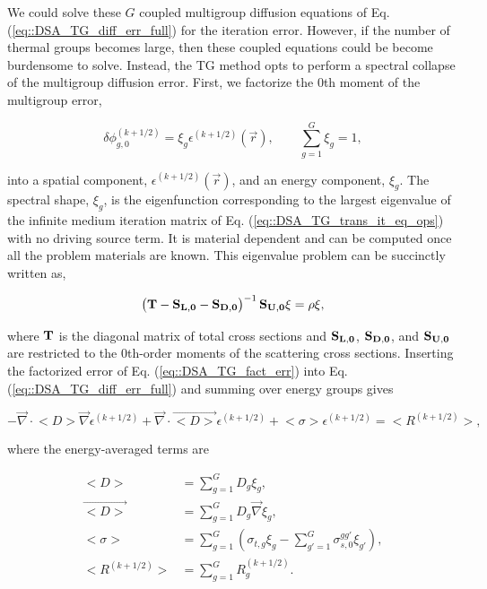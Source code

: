 \noindent We could solve these $G$ coupled multigroup diffusion equations of Eq. (\ref{eq::DSA_TG_diff_err_full}) for the iteration error. However, if the number of thermal groups becomes large, then these coupled equations could be become burdensome to solve. Instead, the TG method opts to perform a spectral collapse of the multigroup diffusion error. First, we factorize the 0th moment of the multigroup error,

\begin{equation}
\label{eq::DSA_TG_fact_err}
\delta \phi_{g,0}^{(k+1/2)} = \xi_g \epsilon^{(k+1/2)} (\vec{r}), \qquad \sum_{g=1}^G \xi_g = 1,
\end{equation}

\noindent into a spatial component, $\epsilon^{(k+1/2)} (\vec{r})$, and an energy component, $\xi_g$. The spectral shape, $\xi_g$, is the eigenfunction corresponding to the largest eigenvalue of the infinite medium iteration matrix of Eq. (\ref{eq::DSA_TG_trans_it_eq_ops}) with no driving source term. It is material dependent and can be computed once all the problem materials are known. This eigenvalue problem can be succinctly written as,

\begin{equation}
\label{eq::DSA_TG_eigenpprob}
\left(  {\bf T} - {\bf S_{L,0}} - {\bf S_{D,0}} \right)^{-1} {\bf S_{U,0}} \xi = \rho \xi ,
\end{equation}

\noindent where ${\bf T}$ is the diagonal matrix of total cross sections and ${\bf S_{L,0}}$, ${\bf S_{D,0}}$, and ${\bf S_{U,0}}$ are restricted to the 0th-order moments of the scattering cross sections. Inserting the factorized error of Eq. (\ref{eq::DSA_TG_fact_err}) into Eq. (\ref{eq::DSA_TG_diff_err_full}) and summing over energy groups gives

\begin{equation}
\label{eq::DSA_TG_1G_err_eq_wdrift}
-\vec{\nabla} \cdot \big< D \big> \vec{\nabla} \epsilon^{(k+1/2)} + \vec{\nabla} \cdot \vec{\big< D \big>} \epsilon^{(k+1/2)} + \big< \sigma \big> \epsilon^{(k+1/2)}  = \big< R^{(k+1/2)} \big> ,
\end{equation}

\noindent where the energy-averaged terms are 

\begin{equation}
\label{eq::DSA_TG_1G_ave_terms}
\begin{aligned}
\big< D \big> &= \sum_{g=1}^G D_g \xi_g, \\
\vec{\big< D \big>} &= \sum_{g=1}^G D_g \vec{\nabla} \xi_g ,\\
\big< \sigma \big> &= \sum_{g=1}^G \left( \sigma_{t,g} \xi_g -  \sum_{g'=1}^G \sigma_{s,0}^{g g'}  \xi_{g'} \right), \\
\big< R^{(k+1/2)} \big> &= \sum_{g=1}^G R_g^{(k+1/2)}.
\end{aligned}
\end{equation}

